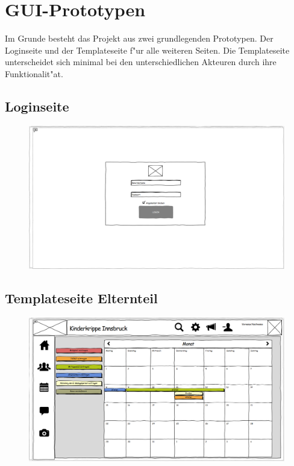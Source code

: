 \newpage
\section{GUI-Prototypen}
Im Grunde besteht das Projekt aus zwei grundlegenden Prototypen. Der Loginseite und der Templateseite f"ur alle weiteren Seiten. 
Die Templateseite unterscheidet sich minimal bei den unterschiedlichen Akteuren durch ihre Funktionalit"at.

\subsection{Loginseite}
 \begin{figure}[ht!]
  \includegraphics[width = 150mm]{pictures/Login.PNG}
 \end{figure}
 
 \newpage
 \subsection{Templateseite Elternteil}
 \begin{figure}[ht!]
  \includegraphics[width = 150mm]{pictures/Grundstellung_Elternteil.PNG}
 \end{figure}
 
